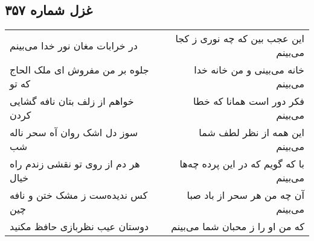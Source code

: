 \begin{center}
\section*{غزل شماره ۳۵۷}
\label{sec:sh357}
\begin{longtable}{l p{0.5cm} r}
در خرابات مغان نور خدا می‌بینم
&&
این عجب بین که چه نوری ز کجا می‌بینم
\\
جلوه بر من مفروش ای ملک الحاج که تو
&&
خانه می‌بینی و من خانه خدا می‌بینم
\\
خواهم از زلف بتان نافه گشایی کردن
&&
فکر دور است همانا که خطا می‌بینم
\\
سوز دل اشک روان آه سحر ناله شب
&&
این همه از نظر لطف شما می‌بینم
\\
هر دم از روی تو نقشی زندم راه خیال
&&
با که گویم که در این پرده چه‌ها می‌بینم
\\
کس ندیده‌ست ز مشک ختن و نافه چین
&&
آن چه من هر سحر از باد صبا می‌بینم
\\
دوستان عیب نظربازی حافظ مکنید
&&
که من او را ز محبان شما می‌بینم
\\
\end{longtable}
\end{center}

